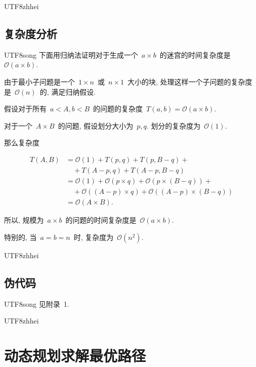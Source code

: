 \documentclass[10.5pt,compsoc]{CjC}
\theoremstyle{mystyle}
\begin{document}
\begin{CJK*}{UTF8}{zhhei}\subsection{复杂度分析}\end{CJK*}

\begin{CJK*}{UTF8}{song}
下面用归纳法证明对于生成一个~$a \times b$~的迷宫的时间复杂度是~$\mathcal{O}(a \times b)$.

由于最小子问题是一个~$1 \times n$~或~$n \times 1$~大小的块, 
处理这样一个子问题的复杂度是~$\mathcal{O}(n)$~的, 满足归纳假设.

假设对于所有~$a < A, b < B$~的问题的复杂度~$T(a,b) = \mathcal{O}(a \times b)$.

对于一个~$A \times B$~的问题, 假设划分大小为~$p, q$. 划分的复杂度为~$\mathcal{O}(1)$.

那么复杂度

\vskip -4mm

\begin{align*}
T(A,B) &= \mathcal{O}(1) + T(p,q) + T(p,B-q) + {} \\
       &\quad + T(A-p,q) + T(A-p,B-q) \\
       &= \mathcal{O}(1) + \mathcal{O}(p \times q) + \mathcal{O}(p \times (B - q)) + {} \\
       &\quad + \mathcal{O}((A - p) \times q) + \mathcal{O}((A - p) \times (B - q)) \\
       &= \mathcal{O}(A \times B).
\end{align*}


所以, 规模为~$a \times b$~的问题的时间复杂度是~$\mathcal{O}(a \times b)$.

特别的, 当~$a=b=n$~时, 复杂度为~$\mathcal{O}(n^2)$.
\end{CJK*}

\begin{CJK*}{UTF8}{zhhei}\subsection{伪代码}\end{CJK*}

\begin{CJK*}{UTF8}{song}
见附录~1.
\end{CJK*}


\begin{CJK*}{UTF8}{zhhei}
\vskip 1mm
\section{动态规划求解最优路径}
\end{CJK*}
\end{document}

